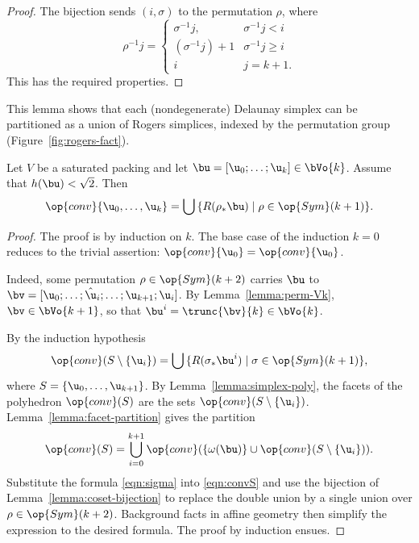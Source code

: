 \begin{cnl}
\begin{proof} 
The bijection sends $(i,\sigma)$ to the permutation $\rho$, where
\[  
\rho^{-1} j = \begin{cases} 
\sigma^{-1} j, & \sigma^{-1} j<i\\
(\sigma^{-1}j)+1 & \sigma^{-1} j \ge i\\
i& j=k+1.
\end{cases}
\] 
This has the required properties.
\end{proof}

This lemma shows that each (nondegenerate) Delaunay simplex can be
partitioned as a union of Rogers simplices, indexed by the permutation
group (Figure~\ref{fig:rogers-fact}).

\figYAJOTSL %

\begin{lemma}
\label{lemma:Rconv}  
%
  Let $V$ be a saturated packing and let $\bu = \listdots{\u}{0}{k}\in
  \bVo{k}$.  Assume that $h(\bu)<\sqrt2$.  
  Then
\[  
\op{conv}\setenumdots{\u}{0}{k} = 
\bigcup \,\setcomp{ R(\rho_*\bu) }{ \rho\in \op{Sym}(k+1)}.
\] 
\end{lemma}
%

\begin{proof} The proof is by induction on $k$.  The base case of the
  induction $k=0$ reduces to the trivial assertion: $\op{conv}\braced{\u_0}
  = \op{conv}\braced{\u_0}$.

  \claim{We claim $\bu^i\in \bVo{k}$, when
    $\bu=\listdots{\u}{0}{k+1}]\in \bVo{k+1}$.}  Indeed, some
  permutation $\rho\in \op{Sym}(k+2)$ carries $\bu$ to
  $\bv=[\u_0;\ldots;\hat\u_i;\ldots;\u_{k+1};\u_i]$.  By
  Lemma~\ref{lemma:perm-Vk}, $\bv\in \bVo{k+1}$, so that $\bu^i =
  \trunc{\bv}{k}\in \bVo{k}$.

By the induction hypothesis
\begin{equation}\label{eqn:sigma} 
 \op{conv}(S\setminus\braced{\u_i}) = 
 \bigcup \,\setcomp{ R(\sigma_*\bu^i) }{ \sigma\in \op{Sym}(k+1)},
\end{equation}
where $S = \setenumdots{\u}{0}{k+1}$.  By
Lemma~\ref{lemma:simplex-poly}, the facets of the polyhedron
$\op{conv}(S)$ are the sets $\op{conv}(S\setminus\braced{\u_i})$.
Lemma~\ref{lemma:facet-partition} gives the partition
\begin{equation} \label{eqn:convS}
\op{conv}(S) = \bigcup_{i=0}^{k+1} \op{conv}(\braced{\omega(\bu)}
\cup \op{conv}(S\setminus\braced{\u_i})).
\end{equation}
Substitute the formula \eqref{eqn:sigma} into \eqref{eqn:convS} and
use the bijection of Lemma~\ref{lemma:coset-bijection} to replace the
double union by a single union over $\rho\in \op{Sym}(k+2)$.
Background facts in affine geometry then simplify the expression to
the desired formula.  The proof by induction ensues.
\end{proof}




\end{cnl}

